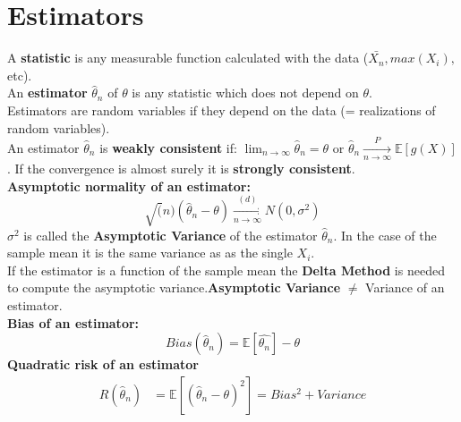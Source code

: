 \section{Estimators}

A \textbf{statistic} is any measurable function calculated with the data ($\bar{X_n}, max(X_i),$ etc).\\

An \textbf{estimator} $\hat{\theta }_ n$ of $\theta$ is any statistic which does not depend on $\theta$.\\

Estimators are random variables if they depend on the data (= realizations of random variables).\\

An estimator $\hat{\theta }_ n$ is \textbf{weakly consistent} if: $\displaystyle \lim _{n \to \infty } \hat{\theta }_ n = \theta$ or $ \hat{\theta}_n \xrightarrow[n \rightarrow \infty]{P} \mathbb{E}[g(X)]$. If the convergence is almost surely it is \textbf{strongly consistent}.\\
\textbf{Asymptotic normality of an estimator:}
\[\sqrt(n) (\hat{\theta}_n-\theta) \xrightarrow[n \rightarrow \infty]{(d)} N(0,\sigma^2)\]
$\sigma^2$ is called the \textbf{Asymptotic Variance} of the estimator $\hat{\theta}_n$. In the case of the sample mean it is the same variance as as the single $X_i$.\\
If the estimator is a function of the sample mean the \textbf{Delta Method} is needed to compute the asymptotic variance.\textbf{Asymptotic Variance} $\neq$ Variance of an estimator.\\
\textbf{Bias of an estimator:}
\[Bias(\hat{\theta}_n) = \mathbb{E}[\hat{\theta_n}] - \theta\]
\textbf{Quadratic risk of an estimator}
\begin{align*}
R(\hat{\theta}_n) & = \mathbb{E}[(\hat{\theta}_n-\theta)^2]  = Bias^2 + Variance
\end{align*}
